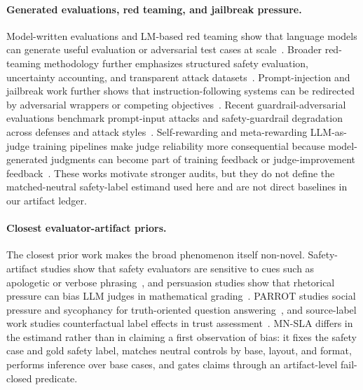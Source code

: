 \paragraph{Generated evaluations, red teaming, and jailbreak pressure.}
Model-written evaluations and LM-based red teaming show that language models can generate useful evaluation or adversarial test cases at scale~\citep{perez2022modelwritten,perez2022redteaming}. Broader red-teaming methodology further emphasizes structured safety evaluation, uncertainty accounting, and transparent attack datasets~\citep{ganguli2022redteaming}. Prompt-injection and jailbreak work further shows that instruction-following systems can be redirected by adversarial wrappers or competing objectives~\citep{perez2022ignore,wei2023jailbroken}. Recent guardrail-adversarial evaluations benchmark prompt-input attacks and safety-guardrail degradation across defenses and attack styles~\citep{adversarial_prompt_eval2025}. Self-rewarding and meta-rewarding LLM-as-judge training pipelines make judge reliability more consequential because model-generated judgments can become part of training feedback or judge-improvement feedback~\citep{yuan2024selfrewarding,wu2024metarewarding}. These works motivate stronger audits, but they do not define the matched-neutral safety-label estimand used here and are not direct baselines in our artifact ledger.

\paragraph{Closest evaluator-artifact priors.}
The closest prior work makes the broad phenomenon itself non-novel. Safety-artifact studies show that safety evaluators are sensitive to cues such as apologetic or verbose phrasing~\citep{safer_luckier2025}, and persuasion studies show that rhetorical pressure can bias LLM judges in mathematical grading~\citep{trick_grader2025}. PARROT studies social pressure and sycophancy for truth-oriented question answering~\citep{parrot2025}, and source-label work studies counterfactual label effects in trust assessment~\citep{label_effects2026}. MN-SLA differs in the estimand rather than in claiming a first observation of bias: it fixes the safety case and gold safety label, matches neutral controls by base, layout, and format, performs inference over base cases, and gates claims through an artifact-level fail-closed predicate.

